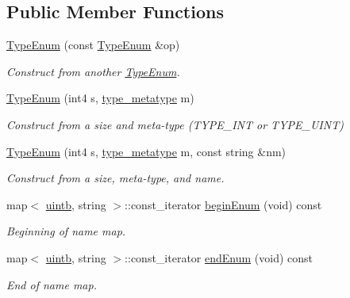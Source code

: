 \subsection*{Public Member Functions}
\begin{DoxyCompactItemize}
\item 
\mbox{\hyperlink{class_type_enum_a95accac1e8a92b0ae55ea96c89e9e8a0}{Type\+Enum}} (const \mbox{\hyperlink{class_type_enum}{Type\+Enum}} \&op)
\begin{DoxyCompactList}\small\item\em Construct from another \mbox{\hyperlink{class_type_enum}{Type\+Enum}}. \end{DoxyCompactList}\item 
\mbox{\hyperlink{class_type_enum_aacd079a04693c1610315e299ad7ce2c6}{Type\+Enum}} (int4 s, \mbox{\hyperlink{type_8hh_aef6429f2523cdf4d415ba04a0209e61f}{type\+\_\+metatype}} m)
\begin{DoxyCompactList}\small\item\em Construct from a size and meta-\/type (T\+Y\+P\+E\+\_\+\+I\+NT or T\+Y\+P\+E\+\_\+\+U\+I\+NT) \end{DoxyCompactList}\item 
\mbox{\hyperlink{class_type_enum_a89a591b999e4df06cf4d9896c11369e2}{Type\+Enum}} (int4 s, \mbox{\hyperlink{type_8hh_aef6429f2523cdf4d415ba04a0209e61f}{type\+\_\+metatype}} m, const string \&nm)
\begin{DoxyCompactList}\small\item\em Construct from a size, meta-\/type, and name. \end{DoxyCompactList}\item 
map$<$ \mbox{\hyperlink{types_8h_a2db313c5d32a12b01d26ac9b3bca178f}{uintb}}, string $>$\+::const\+\_\+iterator \mbox{\hyperlink{class_type_enum_afd8ca15a5bda006a1d65737b1e3109e1}{begin\+Enum}} (void) const
\begin{DoxyCompactList}\small\item\em Beginning of name map. \end{DoxyCompactList}\item 
map$<$ \mbox{\hyperlink{types_8h_a2db313c5d32a12b01d26ac9b3bca178f}{uintb}}, string $>$\+::const\+\_\+iterator \mbox{\hyperlink{class_type_enum_a60c142f090f378f3d79627d992fe5483}{end\+Enum}} (void) const
\begin{DoxyCompactList}\small\item\em End of name map. \end{DoxyCompactList}\item 

\end{DoxyCompactItemize}
